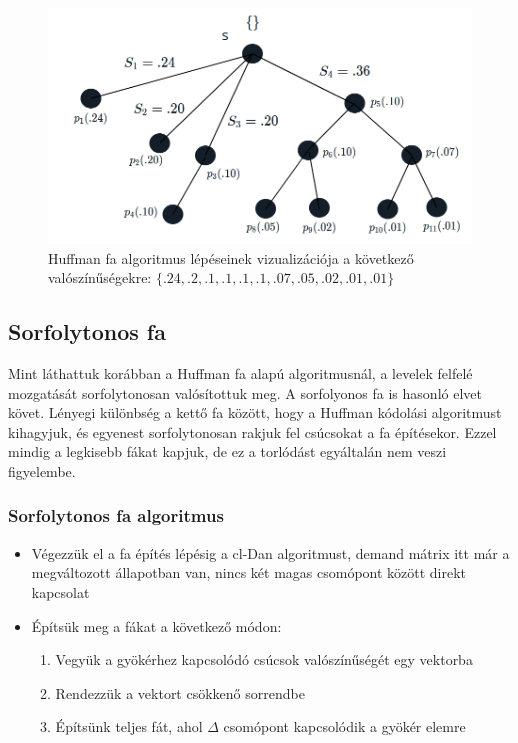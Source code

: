 \documentclass[12pt]{report}
\begin{document}
\begin{figure}[H]
\begin{center}
		\includegraphics[width=0.49\linewidth]{pictures/huffman6.png}
		\caption{Huffman fa algoritmus lépéseinek vizualizációja a következő valószínűségekre: 
			 \( \{.24, .2, .1, .1, .1, .1, .07, .05, .02, .01, .01\}\) }
		\label{huffman-algorithm}
	\end{center}
\end{figure}


\subsection{Sorfolytonos fa}

Mint láthattuk korábban a Huffman fa alapú algoritmusnál, a levelek felfelé mozgatását sorfolytonosan valósítottuk meg. A sorfolyonos fa is hasonló elvet követ.
Lényegi különbség a kettő fa között, hogy a Huffman kódolási algoritmust kihagyjuk, és egyenest sorfolytonosan rakjuk fel csúcsokat a fa építésekor.
Ezzel mindig a legkisebb fákat kapjuk, de ez a torlódást egyáltalán nem veszi figyelembe.

\subsubsection{Sorfolytonos fa algoritmus}
\begin{itemize}
	\item Végezzük el a fa építés lépésig a cl-Dan algoritmust, demand mátrix itt már a megváltozott állapotban van, nincs két magas csomópont között direkt kapcsolat
	\item Építsük meg a fákat a következő módon:
	\begin{enumerate}
		\item Vegyük a gyökérhez kapcsolódó csúcsok valószínűségét egy vektorba
		\item Rendezzük a vektort csökkenő sorrendbe
		\item Építsünk teljes fát, ahol $\Delta$ csomópont kapcsolódik a gyökér elemre
	\end{enumerate}
\end{itemize}
\end{document}
